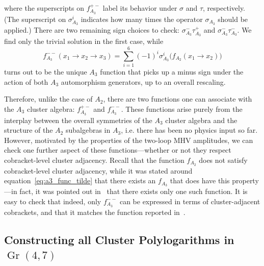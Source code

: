 \documentclass[11pt]{article}
\DeclareMathOperator{\Gr}{Gr}
\begin{document}
where the superscripts on $f_{A_3}^{+-}$ label its behavior under $\sigma$ and $\tau$, respectively. (The superscript on $\sigma_{A_3}^i$ indicates how many times the operator $\sigma_{A_3}$ should be applied.) There are two remaining sign choices to check: $\sigma^-_{A_3}\tau^+_{A_3}$ and $\sigma^-_{A_3}\tau^-_{A_3}$. We find only the trivial solution in the first case, while		
\begin{equation} \label{eq:fA3mm}
	f_{A_3}^{--}(x_1\to x_2\to x_3) =\sum_{i=1}^6(-1)^i\sigma_{A_3}^i \big(f_{A_2}(x_1\to x_2)\big)
\end{equation}
turns out to be the unique $A_3$ function that picks up a minus sign under the action of both $A_3$ automorphism generators, up to an overall rescaling.

Therefore, unlike the case of $A_2$, there are two functions one can associate with the $A_3$ cluster algebra: $f_{A_3}^{+-}$ and $f_{A_3}^{--}$. These functions arise purely from the interplay between the overall symmetries of the $A_3$ cluster algebra and the structure of the $A_2$ subalgebras in $A_3$, i.e. there has been no physics input so far. However, motivated by the properties of the two-loop MHV amplitudes, we can check one further aspect of these functions---whether or not they respect cobracket-level cluster adjacency. Recall that the function $f_{A_2}$ does not satisfy cobracket-level cluster adjacency, while it was stated around equation~\eqref{eq:a3_func_tilde} that there exists an $f_{A_3}$ that does have this property---in fact, it was pointed out in~\cite{Golden:2014xqa} that there exists only one such function. It is easy to check that indeed, only $f_{A_3}^{--}$ can be expressed in terms of cluster-adjacent cobrackets, and that it matches the function reported in~\cite{Golden:2014xqa}. 

\subsection{Constructing all Cluster Polylogarithms in $\Gr(4,7)$} \label{sec:all_nonclassical_polylogs_gr47}
\end{document}

